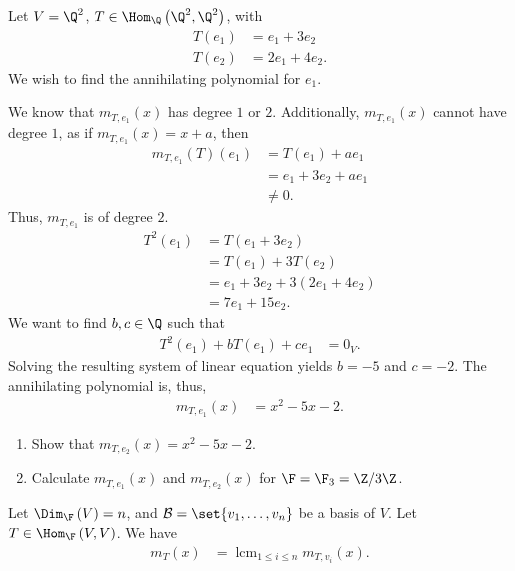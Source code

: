 \documentclass[10pt]{mypackage}
\DeclareMathOperator*{\lcm}{lcm}
\begin{document}
\begin{example}
  Let $V = \Q^2$, $T\in \Hom_{\Q}\left(\Q^2,\Q^2\right)$, with
  \begin{align*}
    T\left(e_1\right) &= e_1 + 3e_2\\
    T\left(e_2\right) &= 2e_1 + 4e_2.
  \end{align*}
  We wish to find the annihilating polynomial for $e_1$.\newline

  We know that $m_{T,e_1}(x)$ has degree $1$ or $2$. Additionally, $m_{T,e_1}(x)$ cannot have degree $1$, as if $m_{T,e_1}\left(x\right) = x+a$, then
  \begin{align*}
    m_{T,e_1}\left(T\right)\left(e_1\right) &= T\left(e_1\right) + ae_1\\
                                            &= e_1 + 3e_2 + ae_1\\
                                            &\neq 0.
  \end{align*}
  Thus, $m_{T,e_1}$ is of degree $2$.
  \begin{align*}
    T^2\left(e_1\right) &= T\left(e_1 + 3e_2\right)\\
                        &= T\left(e_1\right) + 3T\left(e_2\right)\\
                        &= e_1 + 3e_2 + 3\left(2e_1 + 4e_2\right)\\
                        &= 7e_1 + 15 e_2.
  \end{align*}
  We want to find $b,c\in \Q$ such that
  \begin{align*}
    T^2\left(e_1\right) + bT\left(e_1\right) + ce_1 &= 0_V.
  \end{align*}
  Solving the resulting system of linear equation yields $b = -5$ and $c = -2$. The annihilating polynomial is, thus,
  \begin{align*}
    m_{T,e_1}(x) &= x^2 - 5x - 2.
  \end{align*}
\end{example}
\begin{exercise}\hfill
  \begin{enumerate}[(1)]
    \item Show that $m_{T,e_2}(x) = x^2 - 5x - 2$.
    \item Calculate $m_{T,e_1}(x)$ and $m_{T,e_2}(x)$ for $\F = \F_3 = \Z/3\Z$.
  \end{enumerate}
\end{exercise}
\begin{theorem}
  Let $\Dim_{\F}\left(V\right) = n$, and $\mathcal{B} = \set{v_1,\dots,v_n}$ be a basis of $V$. Let $T\in \Hom_{\F}\left(V,V\right)$. We have
  \begin{align*}
    m_{T}\left(x\right) &= \lcm_{1 \leq i \leq n}m_{T,v_i}\left(x\right).
  \end{align*}
\end{theorem}
\end{document}
